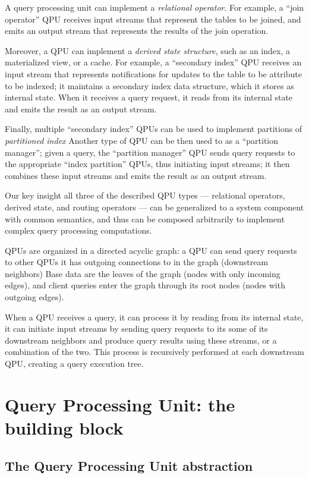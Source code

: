 \medskip
\noindent
A query processing unit can implement a \textit{relational operator}.
For example, a ``join operator'' QPU receives input streams that represent the tables to be joined,
and emits an output stream that represents the results of the join operation.

Moreover, a QPU can implement a \textit{derived state structure}, such as an index, a materialized view, or a cache.
For example, a ``secondary index'' QPU receives an input stream that represents notifications for updates to the table
to be attribute to be indexed; it maintains a secondary index data structure, which it stores as internal state.
When it receives a query request, it reads from its internal state and emits the result as an output stream.

Finally, multiple ``secondary index'' QPUs can be used to implement partitions of \textit{partitioned index}
Another type of QPU can be then used to as a ``partition manager''; given a query, the ``partition manager'' QPU sends query
requests to the appropriate  ``index partition'' QPUs, thus initiating input streams; it then combines these input streams
and emits the result as an output stream.

Our key insight all three of the described QPU types --- relational operators, derived state, and routing operators ---
can be generalized to a system component with common semantics, and thus can be composed arbitrarily to implement complex
query processing computations.

\medskip
\noindent
QPUs are organized in a directed acyclic graph:
a QPU can send query requests to other QPUs it has outgoing connections to in the graph (downstream neighbors)
Base data are the leaves of the graph (nodes with only incoming edges),
and client queries enter the graph through its root nodes (nodes with outgoing edges).

When a QPU receives a query, it can process it by reading from its internal state, it can initiate input streams
by sending query requests to its some of its downstream neighbors and produce query results using these streams,
or a combination of the two.
This process is recursively performed at each downstream QPU, creating a query execution tree.

\section{Query Processing Unit: the building block}

\subsection{The Query Processing Unit abstraction}

